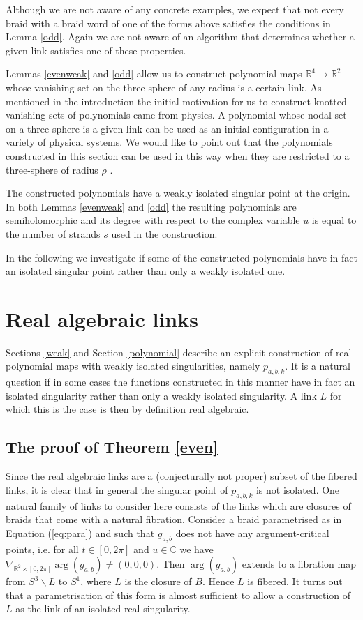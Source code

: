 \documentclass[notitlepage,12pt]{revtex4-1}
\begin{document}
Although we are not aware of any concrete examples, we expect that not every braid with a braid word of one of the forms above satisfies the conditions in Lemma \ref{odd}. Again we are not aware of an algorithm that determines whether a given link satisfies one of these properties.  

Lemmas \ref{evenweak} and \ref{odd} allow us to construct polynomial maps $\mathbb{R}^{4}\to\mathbb{R}^{2}$ whose vanishing set on the three-sphere of any radius is a certain link.
As mentioned in the introduction the initial motivation for us to construct knotted vanishing sets of polynomials came from physics. A polynomial whose nodal set on a three-sphere is a given link can be used as an initial configuration in a variety of physical systems. 
We would like to point out that the polynomials constructed in this section can be used in this way when they are restricted to a three-sphere of radius $\rho$ . 

The constructed polynomials have a weakly isolated singular point at the origin. In both Lemmas \ref{evenweak} and \ref{odd} the resulting polynomials are semiholomorphic and its degree with respect to the complex variable $u$ is equal to the number of strands $s$ used in the construction.

In the following we investigate if some of the constructed polynomials have in fact an isolated singular point rather than only a weakly isolated one.

\section{Real algebraic links}
\label{real}

Sections \ref{weak} and Section \ref{polynomial} describe an explicit construction of real polynomial maps with weakly isolated singularities, namely $p_{a,b,k}$. It is a natural question if in some cases the functions constructed in this manner have in fact an isolated singularity rather than only a weakly isolated singularity. A link $L$ for which this is the case is then by definition real algebraic.

\subsection{The proof of Theorem \ref{even}}

Since the real algebraic links are a (conjecturally not proper) subset of the fibered links, it is clear that in general the singular point of $p_{a,b,k}$ is not isolated. One natural family of links to consider here consists of the links which are closures of braids that come with a natural fibration. Consider a braid parametrised as in Equation (\ref{eq:para}) and such that $g_{a,b}$ does not have any argument-critical points, i.e. for all $t\in[0,2\pi]$ and $u\in\mathbb{C}$ we have $\nabla_{\mathbb{R}^2\times[0,2\pi]}\arg(g_{a,b})\neq (0,0,0)$. Then $\arg(g_{a,b})$ extends to a fibration map from $S^{3}\backslash L$ to $S^{1}$, where $L$ is the closure of $B$. Hence $L$ is fibered. 
It turns out that a parametrisation of this form is almost sufficient to allow a construction of $L$ as the link of an isolated real singularity.
\end{document}
